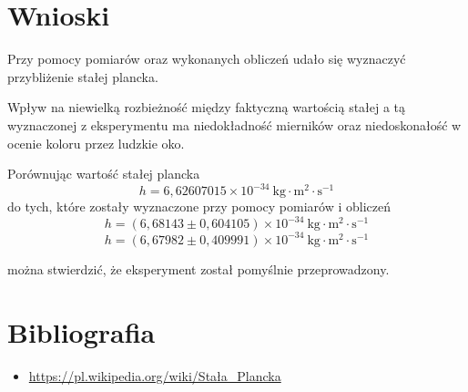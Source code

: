 \documentclass[12pt]{article}
\begin{document}
\section{Wnioski}

Przy pomocy pomiarów oraz wykonanych obliczeń udało się wyznaczyć przybliżenie stałej plancka. 

Wpływ na niewielką rozbieżność między faktyczną wartością stałej a tą wyznaczonej z eksperymentu 
ma niedokładność mierników oraz niedoskonałość w ocenie koloru przez ludzkie oko. \bigskip

Porównując wartość stałej plancka 
\[ h = 6,62607015 \times 10^{-34} \ \textrm{kg} \cdot \textrm{m}^2 \cdot \textrm{s}^{-1} \]
do tych, które zostały wyznaczone przy pomocy pomiarów i obliczeń
\[ h = (6,68143 \pm 0,604105) \times 10^{-34} \ \textrm{kg} \cdot \textrm{m}^2 \cdot \textrm{s}^{-1} \] 
\[ h = (6,67982 \pm 0,409991) \times 10^{-34} \ \textrm{kg} \cdot \textrm{m}^2 \cdot \textrm{s}^{-1} \] 

można stwierdzić, że eksperyment został pomyślnie przeprowadzony.

\section{Bibliografia}

\begin{itemize}
    \item \url{https://pl.wikipedia.org/wiki/Stała_Plancka}
\end{itemize}
\end{document}
